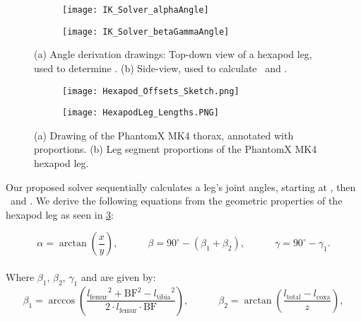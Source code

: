 \begin{figure}[!h]
	\begin{subfigure}{.5\textwidth} %
		\centering
		\texttt{[image: IK\_Solver\_alphaAngle]}  %
		\caption{}
		\label{figure: IK Solver Alpha Angle}
	\end{subfigure}
	\begin{subfigure}{.5\textwidth}
		\centering
		\texttt{[image: IK\_Solver\_betaGammaAngle]}  
		\caption{}
		\label{figure: IK Solver Beta/Gamma Angle}
	\end{subfigure}
	\caption[Angle derivation drawings]{(a) Angle derivation drawings: Top-down view of a hexapod leg, used to determine \textalpha. (b) Side-view, used to calculate \textbeta \ and \textgamma.}
	\label{figure: IK angle derivations}
\end{figure}


\begin{figure}[!h]
	\begin{subfigure}{.5\textwidth}
		\centering
		\texttt{[image: Hexapod\_Offsets\_Sketch.png]}  
		\caption{}
		\label{figure: Hexapod thorax sketch}
	\end{subfigure}
	\begin{subfigure}{.5\textwidth} %
		\centering
		\texttt{[image: HexapodLeg\_Lengths.PNG]}  %
		\caption{}
		\label{figure: Hexapod Leg proportions}
	\end{subfigure}
	\caption[Hexapod proportions]{(a) Drawing of the PhantomX MK4 thorax, annotated with proportions. (b)  Leg segment proportions of the PhantomX MK4 hexapod leg.}
	\label{figure: Hexapod proportions}
\end{figure}

Our proposed solver sequentially calculates a leg's joint angles, starting at \textalpha, then \textbeta \ and \textgamma.
We derive the following equations from the geometric properties of the hexapod leg as seen in \ref{figure: IK angle derivations}:

\[
	\alpha = \arctan(\frac{x}{y}) ,\quad \quad \quad \beta = 90^{\circ} - (\beta_1 + \beta_2) ,\quad \quad \quad \gamma = 90^{\circ} - \gamma_1.
\]
\\
Where $\beta_1$, $\beta_2$, $\gamma_1$ and  are given by:
\[	
	\beta_1 = \arccos(\frac{{l_\text{femur}}^2 + \text{BF}^2 - {l_\text{tibia}}^2}  {2\cdot l_\text{femur} \cdot \text{BF}}) ,\quad \quad \quad \beta_2 = \arctan(\frac{ l_\text{total} - l_\text{coxa}} {z}),
\]


